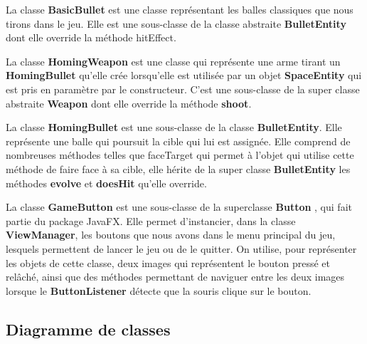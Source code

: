 \documentclass[12pt]{article}
\begin{document}
{La classe \textbf{BasicBullet} est une classe représentant les balles classiques que nous tirons dans le jeu. Elle est une sous-classe de la classe abstraite \textbf{BulletEntity} dont elle override la méthode hitEffect.\newline

La classe \textbf{HomingWeapon} est une classe qui représente une arme tirant un \textbf{HomingBullet} qu'elle crée lorsqu'elle est utilisée par un objet \textbf{SpaceEntity} qui est pris en paramètre par le constructeur. C'est une sous-classe de la super classe abstraite \textbf{Weapon} dont elle override la méthode \textbf{shoot}.\newline

La classe \textbf{HomingBullet} est une sous-classe de la classe \textbf{BulletEntity}. Elle représente une balle qui poursuit la cible qui lui est assignée. Elle comprend de nombreuses méthodes telles que faceTarget qui permet à l'objet qui utilise cette méthode de faire face à sa cible, elle hérite de la super classe \textbf{BulletEntity} les méthodes \textbf{evolve} et \textbf{doesHit} qu'elle override.\newline

La classe \textbf{GameButton} est une sous-classe de la superclasse \textbf{Button} , qui fait partie du package JavaFX. Elle permet d'instancier, dans la classe \textbf{ViewManager}, les boutons que nous avons dans le menu principal du jeu, lesquels permettent de lancer le jeu ou de le quitter. On utilise, pour représenter les objets de cette classe, deux images qui représentent le bouton pressé et relâché, ainsi que des méthodes permettant de naviguer entre les deux images lorsque le \textbf{ButtonListener} détecte que la souris clique sur le bouton.\newline

\subsection{Diagramme de classes}

}
\end{document}
